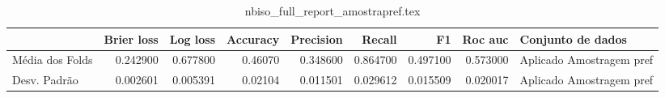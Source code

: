 \begin{table}
\centering
\caption{nbiso_full_report_amostrapref.tex}
\label{nbiso_full_report_amostrapref.tex}
\begin{tabular}{lrrrrrrrl}
\toprule
{}              &  Brier  loss &  Log loss &  Accuracy  &  Precision  &   Recall  &       F1  &  Roc auc  &         Conjunto de dados \\
\midrule
Média dos Folds &     0.242900 &  0.677800 &    0.46070 &    0.348600 &  0.864700 &  0.497100 &  0.573000 &  Aplicado Amostragem pref \\
Desv. Padrão    &     0.002601 &  0.005391 &    0.02104 &    0.011501 &  0.029612 &  0.015509 &  0.020017 &  Aplicado Amostragem pref \\
\bottomrule
\end{tabular}
\end{table}
